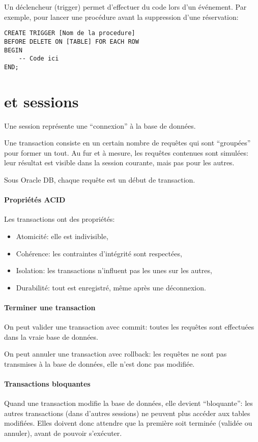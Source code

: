\documentclass[10pt,a4paper,french]{article}
\begin{document}
Un déclencheur (trigger) permet d'effectuer du code lors d'un événement. Par exemple, pour lancer une procédure avant la suppression d'une réservation:
\begin{verbatim}
CREATE TRIGGER [Nom de la procedure]
BEFORE DELETE ON [TABLE] FOR EACH ROW
BEGIN
    -- Code ici
END;
\end{verbatim}

\section{ et sessions}

Une session représente une ``connexion'' à la base de données.

Une transaction consiste en un certain nombre de requêtes qui sont ``groupées'' pour former un tout. Au fur et à mesure, les requêtes contenues sont simulées: leur résultat est visible dans la session courante, mais pas pour les autres.

Sous Oracle DB, chaque requête est un début de transaction.

\paragraph{Propriétés ACID}
Les transactions ont des propriétés:
\begin{itemize}
\item Atomicité: elle est indivisible,
\item Cohérence: les contraintes d'intégrité sont respectées,
\item Isolation: les transactions n'influent pas les unes sur les autres,
\item Durabilité: tout est enregistré, même après une déconnexion.
\end{itemize}

\paragraph{Terminer une transaction}
On peut valider une transaction avec \gls{commit}: toutes les requêtes sont effectuées dans la vraie base de données.

On peut annuler une transaction avec \gls{rollback}: les requêtes ne sont pas transmises à la base de données, elle n'est donc pas modifiée.

\paragraph{Transactions bloquantes}
Quand une transaction modifie la base de données, elle devient ``bloquante'': les autres transactions (dans d'autres sessions) ne peuvent plus accéder aux tables modifiées. Elles doivent donc attendre que la première soit terminée (validée ou annuler), avant de pouvoir s'exécuter.
\end{document}
